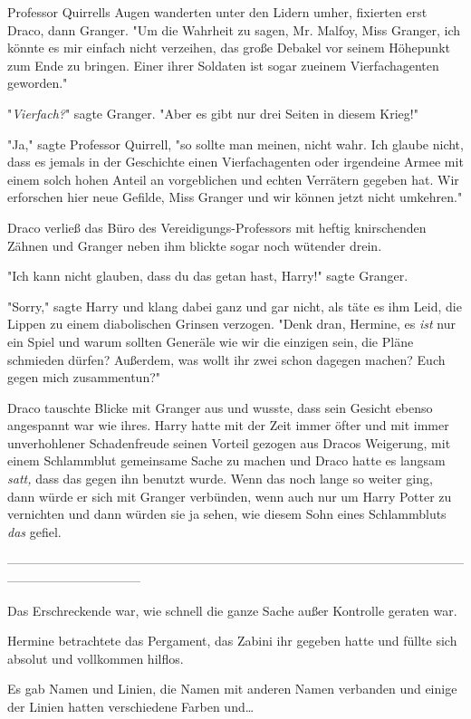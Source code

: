{Professor Quirrells Augen wanderten unter den Lidern umher, fixierten erst Draco, dann Granger. "Um die Wahrheit zu sagen, Mr. Malfoy, Miss Granger, ich könnte es mir einfach nicht verzeihen, das große Debakel vor seinem Höhepunkt zum Ende zu bringen. Einer ihrer Soldaten ist sogar zueinem Vierfachagenten geworden."

"\emph{Vierfach?}" sagte Granger. "Aber es gibt nur drei Seiten in diesem Krieg!"

"Ja," sagte Professor Quirrell, "so sollte man meinen, nicht wahr. Ich glaube nicht, dass es jemals in der Geschichte einen Vierfachagenten oder irgendeine Armee mit einem solch hohen Anteil an vorgeblichen und echten Verrätern gegeben hat. Wir erforschen hier neue Gefilde, Miss Granger und wir können jetzt nicht umkehren."

Draco verließ das Büro des Vereidigungs-Professors mit heftig knirschenden Zähnen und Granger neben ihm blickte sogar noch wütender drein.

"Ich kann nicht glauben, dass du das getan hast, Harry!" sagte Granger.

"Sorry," sagte Harry und klang dabei ganz und gar nicht, als täte es ihm Leid, die Lippen zu einem diabolischen Grinsen verzogen. "Denk dran, Hermine, es \emph{ist} nur ein Spiel und warum sollten Generäle wie wir die einzigen sein, die Pläne schmieden dürfen? Außerdem, was wollt ihr zwei schon dagegen machen? Euch gegen mich zusammentun?"

Draco tauschte Blicke mit Granger aus und wusste, dass sein Gesicht ebenso angespannt war wie ihres. Harry hatte mit der Zeit immer öfter und mit immer unverhohlener Schadenfreude seinen Vorteil gezogen aus Dracos Weigerung, mit einem Schlammblut gemeinsame Sache zu machen und Draco hatte es langsam \emph{satt,} dass das gegen ihn benutzt wurde. Wenn das noch lange so weiter ging, dann würde er sich mit Granger verbünden, wenn auch nur um Harry Potter zu vernichten und dann würden sie ja sehen, wie diesem Sohn eines Schlammbluts \emph{das} gefiel.

--------------------------------------------------------------------------------------------------------------------------------------------

Das Erschreckende war, wie schnell die ganze Sache außer Kontrolle geraten war.

Hermine betrachtete das Pergament, das Zabini ihr gegeben hatte und füllte sich absolut und vollkommen hilflos.

Es gab Namen und Linien, die Namen mit anderen Namen verbanden und einige der Linien hatten verschiedene Farben und…

}
